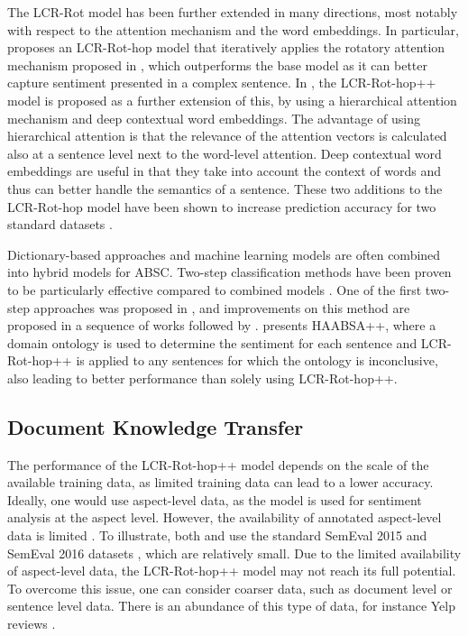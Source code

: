 The LCR-Rot model has been further extended in many directions, most notably with respect to the attention mechanism and the word embeddings. In particular, \cite{Wallaart2019} proposes an LCR-Rot-hop model that iteratively applies the rotatory attention mechanism proposed in \cite{Zheng2018}, which outperforms the base model as it can better capture sentiment presented in a complex sentence. In \cite{Trusca2020}, the LCR-Rot-hop++ model is proposed as a further extension of this, by using a hierarchical attention mechanism and deep contextual word embeddings. The advantage of using hierarchical attention is that the relevance of the attention vectors is calculated also at a sentence level next to the word-level attention. Deep contextual word embeddings are useful in that they take into account the context of words and thus can better handle the semantics of a sentence. These two additions to the LCR-Rot-hop model have been shown to increase prediction accuracy for two standard datasets \cite{SemEval2015, SemEval2016}. 

Dictionary-based approaches and machine learning models are often combined into hybrid models for ABSC. Two-step classification methods have been proven to be particularly effective compared to combined models  \cite{Cambria2018,Chikersal2015,Schouten2016,Schouten2017,Wallaart2019}. One of the first two-step approaches was proposed in \cite{Chikersal2015}, and improvements on this method are proposed in a sequence of works \cite{Schouten2016,Schouten2017,Wallaart2019} followed by \cite{Trusca2020}. \cite{Trusca2020} presents HAABSA++, where a domain ontology is used to determine the sentiment for each sentence and LCR-Rot-hop++ is applied to any sentences for which the ontology is inconclusive, also leading to better performance than solely using LCR-Rot-hop++.

\subsection{Document Knowledge Transfer} 

The performance of the LCR-Rot-hop++ model depends on the scale of the available training data, as limited training data can lead to a lower accuracy. Ideally, one would use aspect-level data, as the model is used for sentiment analysis at the aspect level. However, the availability of annotated aspect-level data is limited \cite{pan2010, He2018}. To illustrate, both \cite{Trusca2020} and \cite{Wallaart2019} use the standard SemEval 2015 and SemEval 2016 datasets \cite{SemEval2015, SemEval2016}, which are relatively small. Due to the limited availability of aspect-level data, the LCR-Rot-hop++ model may not reach its full potential. To overcome this issue, one can consider coarser data, such as document level or sentence level data. There is an abundance of this type of data, for instance Yelp reviews \cite{Tang2015}. 

